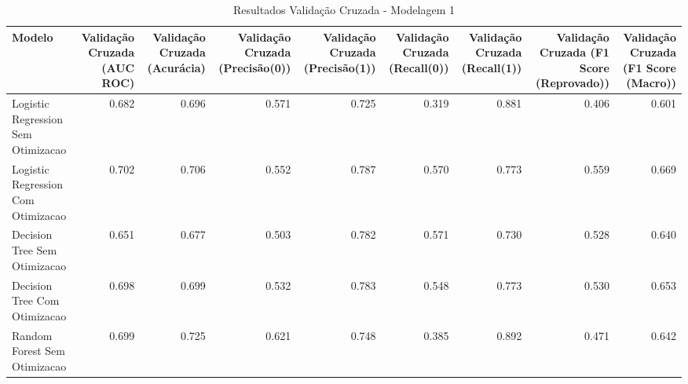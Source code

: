 \begin{table}[H] %
    \centering
    \caption{Resultados Validação Cruzada - Modelagem 1}
    \label{tab:resultados_cv_modelagem_1}
    \renewcommand{\arraystretch}{1.25} %
    \begin{adjustwidth}{ -1in }{ -1in } %
    \centering %
    \small %
    \begin{tabular}{lrrrrrrrr}
\toprule
                            Modelo &  Validação Cruzada (AUC ROC) &  Validação Cruzada (Acurácia) &  Validação Cruzada (Precisão(0)) &  Validação Cruzada (Precisão(1)) &  Validação Cruzada (Recall(0)) &  Validação Cruzada (Recall(1)) &  Validação Cruzada (F1 Score (Reprovado)) &  Validação Cruzada (F1 Score (Macro)) \\
\midrule
Logistic Regression Sem Otimizacao &                        0.682 &                         0.696 &                            0.571 &                            0.725 &                          0.319 &                          0.881 &                                     0.406 &                                 0.601 \\
Logistic Regression Com Otimizacao &                        0.702 &                         0.706 &                            0.552 &                            0.787 &                          0.570 &                          0.773 &                                     0.559 &                                 0.669 \\
      Decision Tree Sem Otimizacao &                        0.651 &                         0.677 &                            0.503 &                            0.782 &                          0.571 &                          0.730 &                                     0.528 &                                 0.640 \\
      Decision Tree Com Otimizacao &                        0.698 &                         0.699 &                            0.532 &                            0.783 &                          0.548 &                          0.773 &                                     0.530 &                                 0.653 \\
      Random Forest Sem Otimizacao &                        0.699 &                         0.725 &                            0.621 &                            0.748 &                          0.385 &                          0.892 &                                     0.471 &                                 0.642 \\

\end{tabular}
\end{adjustwidth}
\end{table}
